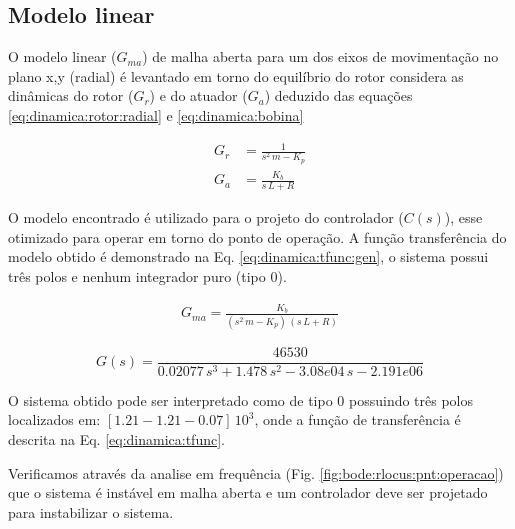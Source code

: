 \subsection{Modelo linear}
O modelo linear ($G_{ma}$) de malha aberta para um dos eixos de movimentação no plano x,y (radial) é levantado em torno do equilíbrio do rotor considera as dinâmicas do rotor ($G_r$) e do atuador ($G_a$) deduzido das equações  \eqref{eq:dinamica:rotor:radial} e \eqref{eq:dinamica:bobina}

\begin{align}
	G_r &= \frac{1}{s^2 \, m - K_p} \\
	G_a &= \frac{K_b}{s\, L + R}
\end{align}

O modelo encontrado é utilizado para o projeto do controlador ($C(s)$), esse otimizado para operar em torno do ponto de operação. A função transferência do modelo obtido é demonstrado na Eq. \eqref{eq:dinamica:tfunc:gen}, o sistema possui três polos e nenhum integrador puro (tipo 0). 

\begin{align}
	G_{ma} = \frac{K_b}{(s^2 \, m - K_p) \, (s\, L + R)}
	\label{eq:dinamica:tfunc:gen}
\end{align}
 


\begin{equation}
G(s) = \frac{46530}{ 0.02077 \, s^3 + 1.478 \, s^2 - 3.08e04 \,s - 2.191e06}
\label{eq:dinamica:tfunc}
\end{equation}







O sistema obtido pode ser interpretado como de tipo 0 possuindo três polos localizados em:  $[1.21 -1.21 -0.07] \, 10^ 3$, onde a função de transferência é descrita na Eq. \eqref{eq:dinamica:tfunc}. 

Verificamos através da analise em frequência (Fig. \ref{fig:bode:rlocus:pnt:operacao}) que o sistema é instável em malha aberta e um controlador deve ser projetado para instabilizar o sistema. 

